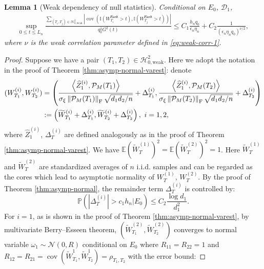 \documentclass[12pt]{article}
\newcommand{\tF}{{\rm F}}
\newcommand{\abs}[1]{\left\lvert#1\right\rvert}
\newcommand{\norm}[1]{\left\lVert#1\right\rVert}
\newcommand{\PP}{\mathbb{P}}
\newcommand{\E}{\mathbb{E}}
\newcommand{\cH}{\mathcal{H}}
\newcommand{\cP}{\mathcal{P}}
\newcommand{\cD}{\mathcal{D}}
\newcommand{\cN}{\mathcal{N}}
\newcommand{\bbI}{\mathbb{I}}
\def\PP{{\mathbb P}}
\newtheorem{Lemma}{Lemma}
\theoremstyle{plain}
\begin{document}
\begin{Lemma}[Weak dependency of null statistics]\label{lemma:weak-cov}
        Conditional on $E_0$, $\cD_1$, 
\begin{equation}
\begin{aligned}
          \sup_{0\le t\le L_n } \frac{\sum_{(T_i,T_j)\in \cH_{0,\text{weak} }^2 } \abs{\operatorname{cov}(\bbI(W_{T_i}^{\mathsf{Rank} }>t),\bbI(W_{T_j}^{\mathsf{Rank} }>t)) }}{ q_0^2 G^2(t)}\le  C_1 \frac{h_n q_0}{\epsilon_n \eta_n }+C_2 \frac{1}{ \left(\epsilon_n\eta_n q_0\right)^{\nu/2} },
\end{aligned}
\end{equation}
where $\nu$ is the weak correlation parameter defined in \eqref{eq:weak-corr-1}.
\end{Lemma}
\begin{proof}
Suppose we have a pair $(T_1,T_2)\in \cH_{0,\text{weak} }^2$. Here we adopt the notation in the proof of Theorem \ref{thm:asymp-normal-varest}: denote 
$$
\begin{aligned}
     (W_{T_1}^{(i)},W_{T_2}^{(i)}) &= \left(\frac{\left\langle  \widehat{Z}_1^{(i)} , \cP_M(T_1) \right\rangle }{\sigma_{\xi} \norm{\cP_M(T_1) }_\tF  \sqrt{d_1 d_2/n}}+ \Delta_{T_1}^{(i)}, \frac{\left\langle  \widehat{Z}_1^{(i)} , \cP_M(T_2) \right\rangle }{\sigma_{\xi} \norm{\cP_M(T_2) }_\tF  \sqrt{d_1 d_2/n}}+ \Delta_{T_2}^{(i)} \right) \\
     &:= \left(\widetilde{W}^{(i)}_{T_1}+\Delta_{T_1}^{(i)}  , \widetilde{W}^{(i)}_{T_2}+\Delta_{T_2}^{(i)} \right),\ i=1,2,
\end{aligned}
$$
where $\widehat{Z}_1^{(i)} $, $\Delta^{(i)}_T$ are defined analogously as in the proof of Theorem \ref{thm:asymp-normal-varest}. We have $\E (\widetilde{W}^{(1)}_T)^2=\E (\widetilde{W}^{(2)}_T)^2=1 $. Here $\widetilde{W}^{(1)}_T$ and $\widetilde{W}^{(2)}_T$ are standardized averages of $n$ i.i.d. samples and can be regarded as the cores which lead to asymptotic normality of $W^{(1)}_T$, $W^{(2)}_T$. By the proof of Theorem \ref{thm:asymp-normal}, the remainder term $ \Delta^{(i)}_T$ is controlled by:
\begin{equation}\label{eq:remainder}
    \PP\left(\abs{\Delta^{(i)}_T}>c_1 h_n | E_0\right)\le C_2 \frac{\log d_1}{d_1^2}.
\end{equation}
For $i=1$, as is shown in the proof of Theorem \ref{thm:asymp-normal-varest},  by multivariate Berry--Esseen theorem,   $(\widetilde{W}^{(2)}_{T_1},\widetilde{W}^{(2)}_{T_2})$  converges to normal variable $\omega_1 \sim \cN(0,R)$ conditional on $E_0$ where $R_{11}=R_{22}=1$ and $R_{12}=R_{21}=\operatorname{cov}(\widetilde{W}^1_{T_1},\widetilde{W}^1_{T_2})=\rho_{T_1,T_2}$ with the error bound:


\end{proof}
\end{document}
